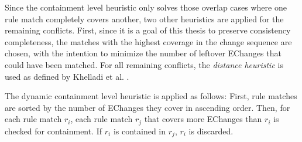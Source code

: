Since the containment level heuristic only solves those overlap cases where one rule match completely covers another, two other heuristics are applied for the remaining conflicts. First, since it is a goal of this thesis to preserve consistency completeness, the matches with the highest coverage in the change sequence are chosen, with the intention to minimize the number of leftover EChanges that could have been matched. 
For all remaining conflicts, the \emph{distance heuristic} is used as defined by Khelladi et al. \cite{khelladi_detecting_complex_changes_2015}.

The dynamic containment level heuristic is applied as follows:
First, rule matches are sorted by the number of EChanges they cover in ascending order.
Then, for each rule match $r_i$, each rule match $r_j$ that covers more EChanges than $r_i$ is checked for containment. If $r_i$ is contained in $r_j$, $r_i$ is discarded.


        

